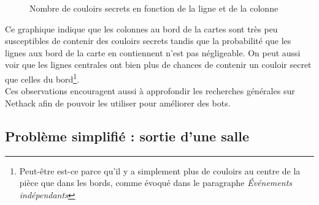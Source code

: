 \documentclass[a4paper,12pt]{article}
\begin{document}
\begin{figure}[H]
  \caption{\label{fig:3d_scorr_graph} Nombre de couloirs secrets en fonction
    de la ligne et de la colonne}
\end{figure}

Ce graphique indique que les colonnes au bord de la cartes sont très peu
susceptibles de contenir des couloirs secrets tandis que la probabilité que les
lignes aux bord de la carte en contiennent n'est pas négligeable. On peut aussi
voir que les lignes centrales ont bien plus de chances de contenir un couloir
secret que celles du bord\footnote{Peut-être est-ce parce qu'il y a simplement
plus de couloirs au centre de la pièce que dans les bords, comme évoqué dans le
paragraphe {\em Événements indépendants}}.
\\
Ces observations encouragent aussi à approfondir les recherches générales sur
Nethack afin de pouvoir les utiliser pour améliorer des bots.

\subsection{Problème simplifié : sortie d'une salle}
\end{document}
